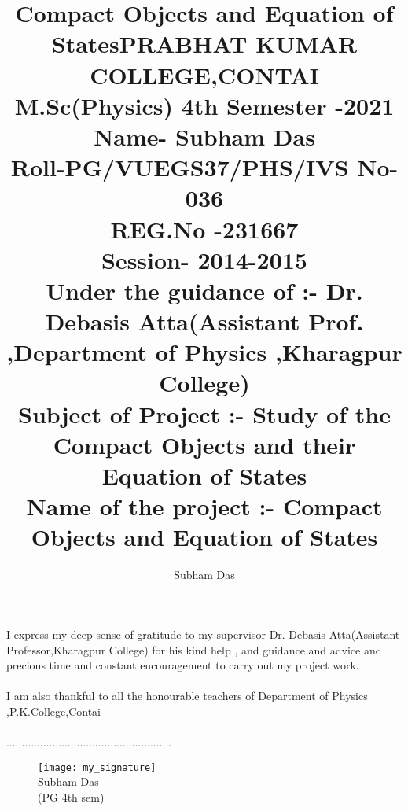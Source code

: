 \documentclass{report}
\begin{document}
\title{\textbf{Compact Objects and Equation of States}}
\author{Subham Das}
\maketitle 
\begin{center}
\title{PRABHAT KUMAR COLLEGE,CONTAI \\
M.Sc(Physics) 4th Semester -2021 \\
Name- Subham Das \\
Roll-PG/VUEGS37/PHS/IVS    No- 036 \\
REG.No -231667 \\
Session- 2014-2015\\
Under the guidance of :-  Dr. Debasis Atta(Assistant Prof. ,Department of Physics ,Kharagpur College) \\
Subject of Project :- Study of the Compact Objects and their Equation of States \\
Name of the project :- Compact Objects and Equation of States\\
 }
\maketitle
\end{center}
\newpage
\begin{center}
\paragraph{ }
I express my deep sense of gratitude to my supervisor  Dr. Debasis Atta(Assistant Professor,Kharagpur College) for his kind help , and guidance and advice and precious time and constant encouragement to carry out my project work.
\paragraph{ }
I am also thankful to all the honourable teachers of Department of Physics ,P.K.College,Contai
\paragraph{ }
......................................................
\begin{flushright}
\begin{figure}[hb!]
\texttt{[image: my\_signature]}\\
Subham Das\\
(PG 4th sem)
\end{figure}
\end{flushright}
\end{center}
\end{document}
